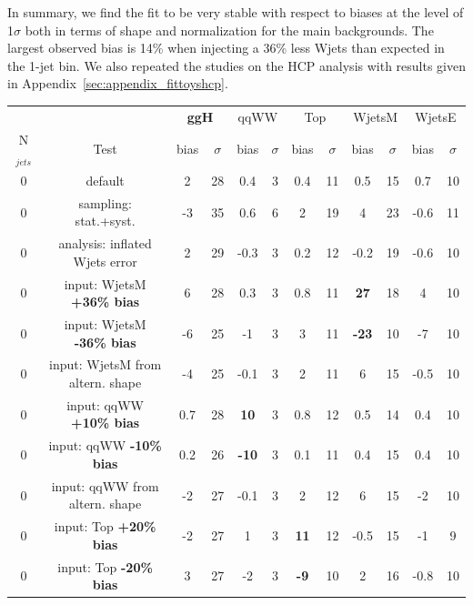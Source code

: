 In summary, we find the fit to be very stable with respect to biases at the level of 1$\sigma$ both in terms of shape and 
normalization for the main backgrounds. The largest observed bias is 14\% when injecting a 36\% less Wjets than expected 
in the 1-jet bin.
We also repeated the studies on the HCP analysis with results given in Appendix~\ref{sec:appendix_fittoyshcp}. 

\begin{table}
\begin{center}
\begin{tabular}{c | c  | c c | c c | c c | c c | c c }
\hline
          &      & \multicolumn{2}{c|}{{\bf ggH}} & \multicolumn{2}{c|}{qqWW} & \multicolumn{2}{c|}{Top} & \multicolumn{2}{c}{WjetsM} & \multicolumn{2}{c}{WjetsE} \\ 
N$_{jets}$ & Test & bias & $\sigma$ & bias & $\sigma$ & bias & $\sigma$ & bias & $\sigma$ & bias & $\sigma$ \\
\hline
0 & default                             &  2  & 28 & 0.4 & 3 & 0.4 & 11 & 0.5 & 15 & 0.7 & 10 \\
0 & sampling: stat.+syst.               & -3  & 35 & 0.6 & 6 &  2  & 19 &  4  & 23 &-0.6 & 11 \\
\hline
0 & analysis: inflated Wjets error      &  2  & 29 & -0.3 & 3 & 0.2 & 12 & -0.2      & 19 & -0.6 & 10 \\
0 & input: WjetsM {\bf +36\% bias}      &  6  & 28 & 0.3  & 3 & 0.8 & 11 & {\bf 27}  & 18 & 4    & 10 \\
0 & input: WjetsM {\bf -36\% bias}      & -6  & 25 & -1   & 3 & 3   & 11 & {\bf -23} & 10 & -7   & 10 \\
0 & input: WjetsM from altern. shape    & -4  & 25 & -0.1 & 3 & 2   & 11 & 6         & 15 & -0.5 & 10 \\
\hline
0 & input: qqWW {\bf +10\% bias}        & 0.7 & 28 & {\bf 10}  & 3 & 0.8 & 12 & 0.5 & 14 & 0.4 & 10 \\
0 & input: qqWW {\bf -10\% bias}        & 0.2 & 26 & {\bf -10} & 3 & 0.1 & 11 & 0.4 & 15 & 0.4 & 10 \\
0 & input: qqWW from altern. shape      & -2  & 27 & -0.1      & 3 & 2   & 12 & 6   & 15 & -2  & 10 \\
\hline
0 & input: Top {\bf +20\% bias}         & -2  & 27  & 1    & 3 & {\bf 11} & 12  & -0.5 & 15  & -1   & 9\\
0 & input: Top {\bf -20\% bias}         & 3   & 27  & -2   & 3 & {\bf -9} & 10  & 2    & 16  & -0.8 & 10\\

\end{tabular}
\end{center}
\end{table}
